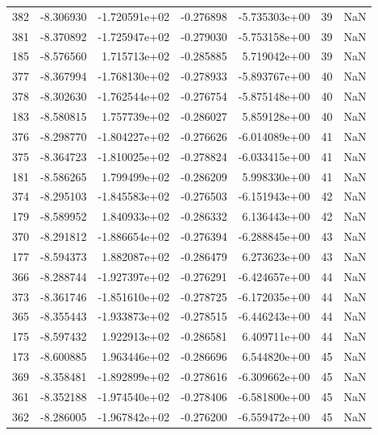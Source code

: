 \begin{tabular}{rrrrrrr}
 382 &  -8.306930 & -1.720591e+02 & -0.276898 & -5.735303e+00 &          39 & NaN \\
 381 &  -8.370892 & -1.725947e+02 & -0.279030 & -5.753158e+00 &          39 & NaN \\
 185 &  -8.576560 &  1.715713e+02 & -0.285885 &  5.719042e+00 &          39 & NaN \\
 377 &  -8.367994 & -1.768130e+02 & -0.278933 & -5.893767e+00 &          40 & NaN \\
 378 &  -8.302630 & -1.762544e+02 & -0.276754 & -5.875148e+00 &          40 & NaN \\
 183 &  -8.580815 &  1.757739e+02 & -0.286027 &  5.859128e+00 &          40 & NaN \\
 376 &  -8.298770 & -1.804227e+02 & -0.276626 & -6.014089e+00 &          41 & NaN \\
 375 &  -8.364723 & -1.810025e+02 & -0.278824 & -6.033415e+00 &          41 & NaN \\
 181 &  -8.586265 &  1.799499e+02 & -0.286209 &  5.998330e+00 &          41 & NaN \\
 374 &  -8.295103 & -1.845583e+02 & -0.276503 & -6.151943e+00 &          42 & NaN \\
 179 &  -8.589952 &  1.840933e+02 & -0.286332 &  6.136443e+00 &          42 & NaN \\
 370 &  -8.291812 & -1.886654e+02 & -0.276394 & -6.288845e+00 &          43 & NaN \\
 177 &  -8.594373 &  1.882087e+02 & -0.286479 &  6.273623e+00 &          43 & NaN \\
 366 &  -8.288744 & -1.927397e+02 & -0.276291 & -6.424657e+00 &          44 & NaN \\
 373 &  -8.361746 & -1.851610e+02 & -0.278725 & -6.172035e+00 &          44 & NaN \\
 365 &  -8.355443 & -1.933873e+02 & -0.278515 & -6.446243e+00 &          44 & NaN \\
 175 &  -8.597432 &  1.922913e+02 & -0.286581 &  6.409711e+00 &          44 & NaN \\
 173 &  -8.600885 &  1.963446e+02 & -0.286696 &  6.544820e+00 &          45 & NaN \\
 369 &  -8.358481 & -1.892899e+02 & -0.278616 & -6.309662e+00 &          45 & NaN \\
 361 &  -8.352188 & -1.974540e+02 & -0.278406 & -6.581800e+00 &          45 & NaN \\
 362 &  -8.286005 & -1.967842e+02 & -0.276200 & -6.559472e+00 &          45 & NaN \\

\end{tabular}
